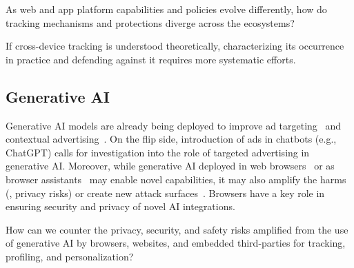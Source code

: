 \begin{opbox}
As web and app platform capabilities and policies evolve differently, how do tracking mechanisms and protections diverge across the ecosystems? 
\end{opbox}


\begin{opbox}
If cross-device tracking is understood theoretically, characterizing its occurrence in practice and defending against it requires more systematic efforts.
\end{opbox}

\subsection{Generative AI}
Generative AI models are already being deployed to improve ad targeting~\cite{adv-week-genai-targeting} and contextual advertising~\cite{cognitiv2024cookieless}. 
%
On the flip side, introduction of ads in chatbots (e.g., ChatGPT) calls for investigation into the role of targeted advertising in generative AI.
%
Moreover, while generative AI deployed in web browsers~\cite{google2024chromeai} or as browser assistants~\cite{vekaria2025big} may enable novel capabilities, it may also amplify the harms (\eg{}, privacy risks) or create new attack surfaces~\cite{mcp-security}. 
%
Browsers have a key role in ensuring security and privacy of novel AI integrations.

\begin{opbox}
How can we counter the privacy, security, and safety risks amplified from the use of generative AI by browsers, websites, and embedded third-parties for tracking, profiling, and personalization?
\end{opbox}